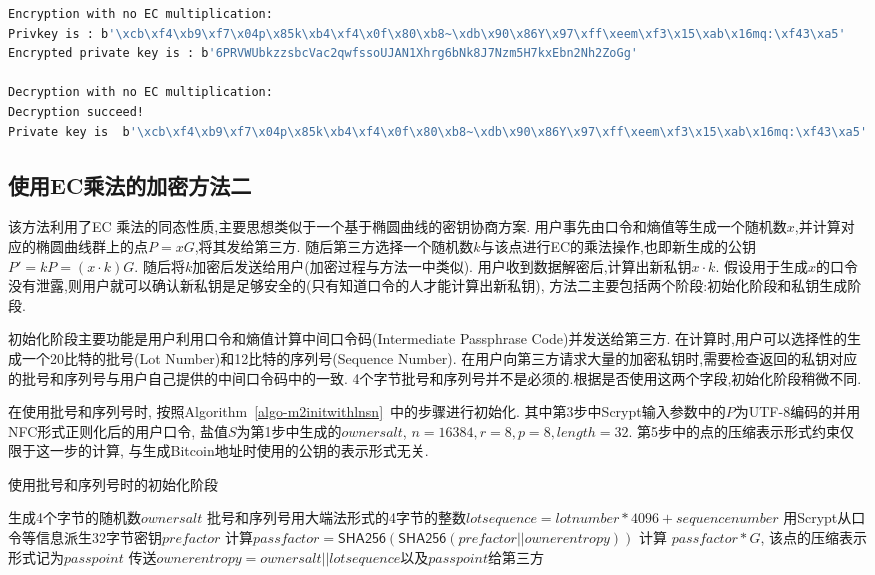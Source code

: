 \begin{lstlisting}[language=bash, caption = Listing~\ref{lst-m1}~的执行结果示例, label=lst-m1res]
Encryption with no EC multiplication:
Privkey is : b'\xcb\xf4\xb9\xf7\x04p\x85k\xb4\xf4\x0f\x80\xb8~\xdb\x90\x86Y\x97\xff\xeem\xf3\x15\xab\x16mq:\xf43\xa5'
Encrypted private key is : b'6PRVWUbkzzsbcVac2qwfssoUJAN1Xhrg6bNk8J7Nzm5H7kxEbn2Nh2ZoGg'

Decryption with no EC multiplication:
Decryption succeed!
Private key is  b'\xcb\xf4\xb9\xf7\x04p\x85k\xb4\xf4\x0f\x80\xb8~\xdb\x90\x86Y\x97\xff\xeem\xf3\x15\xab\x16mq:\xf43\xa5'
\end{lstlisting}


\subsection{使用EC乘法的加密方法二}

该方法利用了EC 乘法的同态性质,主要思想类似于一个基于椭圆曲线的密钥协商方案.
用户事先由口令和熵值等生成一个随机数$x$,并计算对应的椭圆曲线群上的点$P=xG$,将其发给第三方.
随后第三方选择一个随机数$k$与该点进行EC的乘法操作,也即新生成的公钥$P'=kP=(x \cdot k)G$.
随后将$k$加密后发送给用户(加密过程与方法一中类似).
用户收到数据解密后,计算出新私钥$x\cdot k$.
假设用于生成$x$的口令没有泄露,则用户就可以确认新私钥是足够安全的(只有知道口令的人才能计算出新私钥), 
方法二主要包括两个阶段:初始化阶段和私钥生成阶段.

初始化阶段主要功能是用户利用口令和熵值计算中间口令码(Intermediate Passphrase Code)并发送给第三方.  
在计算时,用户可以选择性的生成一个20比特的批号(Lot Number)和12比特的序列号(Sequence Number).
在用户向第三方请求大量的加密私钥时,需要检查返回的私钥对应的批号和序列号与用户自己提供的中间口令码中的一致.
4个字节批号和序列号并不是必须的.根据是否使用这两个字段,初始化阶段稍微不同. 
 
 
 在使用批号和序列号时, 按照Algorithm~\ref{algo-m2initwithlnsn}~中的步骤进行初始化. 
 其中第3步中Scrypt输入参数中的$P$为UTF-8编码的并用NFC形式正则化后的用户口令,
 盐值$S$为第1步中生成的$ownersalt$,  $n=16384, r=8, p=8, length=32$.
 第5步中的点的压缩表示形式约束仅限于这一步的计算, 与生成Bitcoin地址时使用的公钥的表示形式无关.
 
\begin{algorithm}[h]\footnotesize
\caption{使用批号和序列号时的初始化阶段}\label{algo-m2initwithlnsn}
  	\begin{algorithmic}[1]
	   	 \STATE 生成4个字节的随机数$ownersalt$
		\STATE 批号和序列号用大端法形式的4字节的整数$lotsequence=lotnumber * 4096 + sequencenumber$
		\STATE  用Scrypt从口令等信息派生32字节密钥$prefactor$
		\STATE 计算$passfactor = \textsf{SHA256}(\textsf{SHA256}(prefactor || ownerentropy))$
		\STATE 计算 $passfactor * G$, 该点的压缩表示形式记为$passpoint$
		\STATE 传送$ownerentropy = ownersalt || lotsequence$以及$passpoint$给第三方
    \end{algorithmic}
\end{algorithm}


